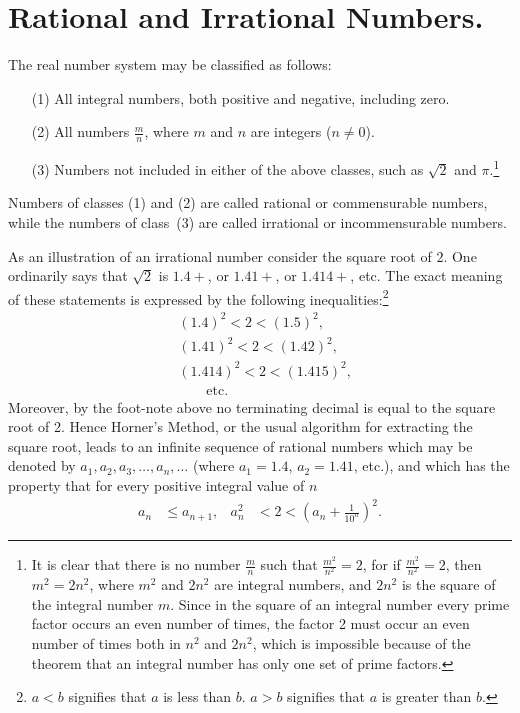 \documentclass[a4paper,12pt]{book}[2004/02/16]
\providecommand{\hyperlink}[2]{#2}
\providecommand{\hypertarget}[2]{#2}
\theoremstyle{ilemma}
\theoremstyle{itheorem}
\theoremstyle{iother}
\theoremstyle{icorollary}
\theoremstyle{numcorollary}
\theoremstyle{idefinition}
\begin{document}
\section{Rational and Irrational Numbers.}\hypertarget{chIsec1}{}%
The real number system may be classified as follows:
\begin{enumerate}

\item[(1)]\hypertarget{item1p1}{} All integral numbers, both positive and negative, including
zero.

\item[(2)]\hypertarget{item2p1}{} All numbers $\frac mn$, where $m$ and $n$ are integers
($n\neq 0$).

\item[(3)]\hypertarget{item3p1}{} Numbers not included in either of the above classes,
such as $\sqrt{2}$ and $\pi$.\footnote{%
    It is clear that there is no number $\frac mn$ such that
    $\frac{m^2}{n^2}=2$, for if $\frac{m^2}{n^2}=2$, then
    $m^2=2n^2$, where $m^2$ and $2n^2$ are integral numbers, and
    $2n^2$ is the square of the integral number $m$. Since in the
    square of an integral number every prime factor occurs an even
    number of times, the factor 2 must occur an even number of
    times both in $n^2$ and $2n^2$, which is impossible because of
    the theorem that an integral number has only one set of prime
    factors.}
\end{enumerate}

Numbers of classes \hyperlink{item1p1}{(1)} and \hyperlink{item2p1}{(2)} are called rational or commensurable
numbers, while the numbers of class~\hyperlink{item3p1}{(3)} are called irrational or
incommensurable numbers.

As an illustration of an irrational number consider the
square root of $2$. One ordinarily says that $\sqrt{2}$ is $1.4+$, or
$1.41+$, or $1.414+$, etc. The exact meaning of these statements is
expressed by the following inequalities:\footnote{%
  $a<b$ signifies
  that $a$ is less than $b$. $a>b$ signifies that $a$ is greater than
  $b$.}
\begin{align*}
&(1.4)^2 < 2 < (1.5)^2, \\
&(1.41)^2 < 2 < (1.42)^2, \\
&(1.414)^2 < 2 < (1.415)^2,\\
&\qquad\mbox{etc.}
\end{align*}
Moreover, by the foot-note above no terminating decimal is equal to
the square root of 2. Hence Horner's Method, or the usual algorithm
for extracting the square root, leads to an infinite sequence of
rational numbers which may be denoted by $a_1, a_2, a_3, \ldots,
a_n,\ldots$ (where $a_1 = 1.4$, $a_2 = 1.41$, etc.), and which has the
property that for every positive integral value of $n$
\begin{align*}
  a_n &\le a_{n+1},
  &a_n^2 &< 2 < \left(a_n + \frac{1}{10^n}\right)^2.
\end{align*}
\end{document}
